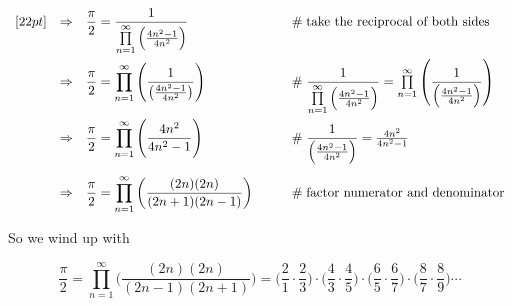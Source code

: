 \documentclass[11pt, oneside]{article}   	%
\begin{document}
\begin{equation*}
\begin{array}{lllll}
[22pt]
&\Rightarrow&  \mathlarger{\dfrac{\pi}{2} = \dfrac{1}{\prod\limits_{n=1}^\infty \Big (\frac{4n^2 - 1}{4n^2}\Big )}}          
		&\qquad \mathrel{\#} \text{take the reciprocal of both sides} \\
[22pt]
&\Rightarrow&  \mathlarger{\dfrac{\pi}{2} = \prod\limits_{n=1}^\infty \left (\dfrac{1}{\left (\frac{4n^2 - 1}{4n^2} \right )} \right )}
		&\qquad \mathrel{\#} \dfrac{1}{\prod\limits_{n=1}^\infty \Big (\frac{4n^2 - 1}{4n^2}\Big )} =
							 \prod\limits_{n=1}^\infty \left (\dfrac{1}{\Big (\frac{4n^2 - 1}{4n^2} \Big )} \right ) \\
[22pt]
&\Rightarrow&  \mathlarger{\dfrac{\pi}{2} = \prod\limits_{n=1}^\infty \Bigg (\frac {4n^2} {4n^2 - 1} \Bigg )}          
		&\qquad \mathrel{\#}  \dfrac{1}{\Big (\frac{4n^2 - 1}{4n^2} \Big )} = \frac {4n^2} {4n^2 - 1}  \\
[22pt]
&\Rightarrow&  \mathlarger{\dfrac{\pi}{2} = \prod\limits_{n=1}^\infty \bigg (\frac {(2n)(2n)} {(2n+1)(2n-1)} \bigg )}            
		&\qquad \mathrel{\#} \text{factor numerator and denominator} \\
		
\end{array}
\end{equation*}


\bigskip
\noindent
So we wind up with


\begin{equation*}
\frac{\pi}{2}  
= \prod\limits_{n =1}^\infty \Bigg  ( \frac{(2n)(2n)}{(2n-1)(2n+1)}  \Bigg ) 
= \Big ( \frac {2}{1} \cdot \frac {2}{3} \Big ) \cdot \Big ( \frac {4}{3} \cdot \frac {4}{5} \Big ) 
   \cdot \Big (\frac {6}{5} \cdot \frac {6}{7} \Big ) \cdot \Big (\frac{8}{7} \cdot \frac{8}{9}\Big ) \cdots 
\end{equation*}
\end{document}
